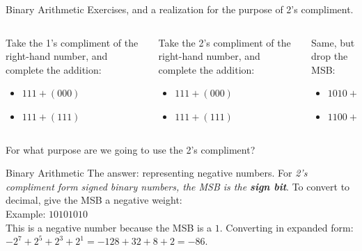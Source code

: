 \documentclass{beamer}
\begin{document}
\begin{frame}{Binary Arithmetic}
Exercises, and a realization for the purpose of 2's compliment. \\ \vspace{0.5cm}
\hrulefill
\begin{columns}[T]
\begin{column}{0.33\textwidth}
Take the 1's compliment of the right-hand number, and complete the addition:
\begin{itemize}
\item $111+(000)$
\item $111+(111)$
\end{itemize}
\end{column}
\begin{column}{0.33\textwidth}
Take the 2's compliment of the right-hand number, and complete the addition:
\begin{itemize}
\item $111+(000)$
\item $111+(111)$
\end{itemize}
\end{column}
\begin{column}{0.33\textwidth}
Same, \alert{but drop the MSB}:
\begin{itemize}
\item $1010+(1010)$
\item $1100+(1100)$
\end{itemize}
\end{column}
\end{columns}
\vspace{0.5cm}
\small
For what purpose are we going to use the 2's compliment?
\end{frame}

\begin{frame}{Binary Arithmetic}
The answer: representing negative numbers.  For \textit{2's compliment form signed binary numbers, the MSB is the \textbf{sign bit}}.  To convert to decimal, \alert{give the MSB a negative weight}: \\ \vspace{0.5cm}
Example: $10101010$ \\ 
This is a negative number because the MSB is a $1$.  Converting in expanded form: $-2^7+2^5+2^3+2^1 = -128+32+8+2 = -86$.
\end{frame}
\end{document}
